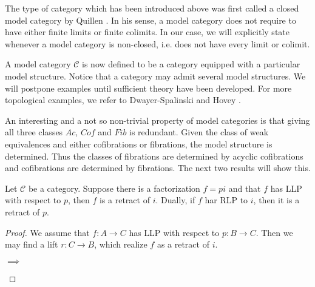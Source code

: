 \documentclass[../thesis.tex]{subfiles}
\begin{document}
            \begin{remark}
                The type of category which has been introduced above was first called a closed model category by Quillen \cite{Quillen67}. In his sense, a model category does not require to have either finite limits or finite colimits. In our case, we will explicitly state whenever a model category is non-closed, i.e. does not have every limit or colimit.
            \end{remark}

            A model category $\mathcal{C}$ is now defined to be a category equipped with a particular model structure. Notice that a category may admit several model structures. We will postpone examples until sufficient theory have been developed. For more topological examples, we refer to Dwayer-Spalinski \cite{Dwyer95} and Hovey \cite{Hovey99}.

            An interesting and a not so non-trivial property of model categories is that giving all three classes $Ac$, $Cof$ and $Fib$ is redundant. Given the class of weak equivalences and either cofibrations or fibrations, the model structure is determined. Thus the classes of fibrations are determined by acyclic cofibrations and cofibrations are determined by fibrations. The next two results will show this.

            \begin{lemma}\label{lem: retract-argument}
                Let $\mathcal{C}$ be a category. Suppose there is a factorization $f = pi$ and that $f$ has LLP with respect to $p$, then $f$ is a retract of $i$. Dually, if $f$ har RLP to $i$, then it is a retract of $p$.
            \end{lemma}

            \begin{proof}
                We assume that $f : A \rightarrow C$ has LLP with respect to $p : B \rightarrow C$. Then we may find a lift $r : C \rightarrow B$, which realize $f$ as a retract of $i$.
                
                \begin{center}
                     $\implies$
                \end{center}
            \end{proof}
\end{document}
